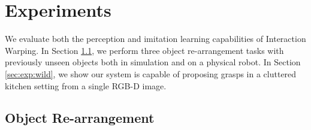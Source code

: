 \documentclass{article}
\newcommand{\rob}[1]{\textcolor{green}{[\textbf{rob:} #1]}}
\begin{document}



\section{Experiments}
\label{sec:exp}

We evaluate both the perception and imitation learning capabilities of Interaction Warping. In Section \ref{sec:exp:rearrangement}, we perform three object re-arrangement tasks with previously unseen objects both in simulation and on a physical robot. In Section \ref{sec:exp:wild}, we show our system is capable of proposing grasps in a cluttered kitchen setting from a single RGB-D image.

\subsection{Object Re-arrangement}
\label{sec:exp:rearrangement}
\end{document}
